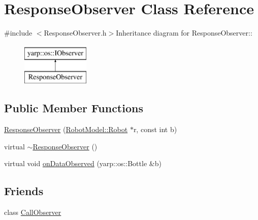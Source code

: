 \hypertarget{class_response_observer}{
\section{ResponseObserver Class Reference}
\label{class_response_observer}
}


{\ttfamily \#include $<$ResponseObserver.h$>$}Inheritance diagram for ResponseObserver::\begin{figure}[H]
\begin{center}
\leavevmode
\includegraphics[height=2cm]{class_response_observer}
\end{center}
\end{figure}
\subsection*{Public Member Functions}
\begin{DoxyCompactItemize}
\item 
\hyperlink{class_response_observer_ac958ccf1a3b7667ef26449a998e5b5be}{ResponseObserver} (\hyperlink{class_robot_model_1_1_robot}{RobotModel::Robot} $\ast$r, const int b)
\item 
virtual \hyperlink{class_response_observer_aabadfb48e9895cec34fe2b54e157739b}{$\sim$ResponseObserver} ()
\item 
virtual void \hyperlink{class_response_observer_a2d847c448b31b5aa880b9282f7bf223d}{onDataObserved} (yarp::os::Bottle \&b)
\end{DoxyCompactItemize}
\subsection*{Friends}
\begin{DoxyCompactItemize}
\item 
class \hyperlink{class_response_observer_a83863f807465c9f8598a4ff381be0506}{CallObserver}
\end{DoxyCompactItemize}


